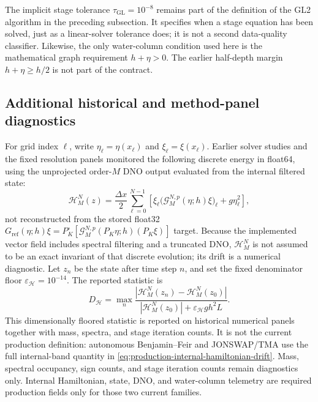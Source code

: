 \documentclass[11pt]{article}
\newcommand{\G}{\mathcal G}
\newcommand{\eps}{\varepsilon}
\begin{document}
The implicit stage tolerance $\tau_{\mathrm{GL}}=10^{-8}$ remains part of the
definition of the GL2 algorithm in the preceding subsection.  It specifies
when a stage equation has been solved, just as a linear-solver tolerance does;
it is not a second data-quality classifier.  Likewise, the only water-column
condition used here is the mathematical graph requirement $h+\eta>0$.  The
earlier half-depth margin $h+\eta\geq h/2$ is not part of the contract.

\subsection{Additional historical and method-panel diagnostics}

For grid index $\ell$, write $\eta_\ell=\eta(x_\ell)$ and
$\xi_\ell=\xi(x_\ell)$.  Earlier solver studies and the fixed resolution
panels monitored the following discrete energy in float64, using the
unprojected order-$M$ DNO output evaluated from the internal filtered state:
\begin{equation}
  \mathcal H_M^N(z)
  =\frac{\Delta x}{2}\sum_{\ell=0}^{N-1}
    \left[
      \xi_\ell\bigl(\G_M^{N,p}(\eta;h)\xi\bigr)_\ell
      +g\eta_\ell^2
    \right],
  \label{eq:discrete-hamiltonian}
\end{equation}
not reconstructed from the stored float32
$G_{\mathrm{ref}}(\eta;h)\xi=P_K^\circ[
\G_M^{N,p}(P_K\eta;h)(P_K\xi)]$ target.  Because the
implemented vector field includes spectral filtering and a truncated DNO,
$\mathcal H_M^N$ is not assumed to be an exact invariant of that discrete evolution;
its drift is a numerical diagnostic.
Let $z_n$ be the state after time step $n$, and set the fixed denominator
floor $\eps_{\mathcal H}=10^{-14}$.  The reported statistic is
\begin{equation}
  D_{\mathcal H}
  =\max_n
   \frac{|\mathcal H_M^N(z_n)-\mathcal H_M^N(z_0)|}
        {|\mathcal H_M^N(z_0)|+\eps_{\mathcal H} g h^2L}.
  \label{eq:hamiltonian-drift}
\end{equation}
This dimensionally floored statistic is reported on historical numerical
panels together with mass, spectra, and stage iteration counts.  It is not the
current production definition: autonomous Benjamin--Feir and JONSWAP/TMA
use the full internal-band quantity in
\eqref{eq:production-internal-hamiltonian-drift}.  Mass, spectral occupancy,
sign counts, and stage iteration counts remain diagnostics only.  Internal
Hamiltonian, state, DNO, and water-column telemetry are required production
fields only for those two current families.
\end{document}
